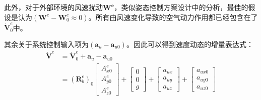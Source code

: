 此外，对于外部环境的风速扰动$\boldsymbol{W^e}$，类似姿态控制方案设计中的分析，最佳的假设是认为$(\boldsymbol{W}^e-\boldsymbol{W}_0^e\approx0)$。所有由风速变化导致的空气动力作用都已经包含在了$\dot{\boldsymbol{V}}^e_0$中。

其余关于系统控制输入项为$(\boldsymbol{a}_{u}-\boldsymbol{a}_{u0})$。因此可以得到速度动态的增量表达式：
\begin{equation}
    \begin{aligned}
        \boldsymbol{\dot{V}}^e&=\boldsymbol{\dot{V}}^e_0+\boldsymbol{a}_{u}-\boldsymbol{a}_{u0}\\
        &=(\boldsymbol{R}_b^e)_0\begin{bmatrix}A_{x0}^e \\A_{y0}^e \\A_{z0}^e\end{bmatrix}+
        \begin{bmatrix}0 \\0 \\g\end{bmatrix}+
        \begin{bmatrix}a_{ux} \\a_{uy} \\a_{uz}\end{bmatrix}+
        \begin{bmatrix}a_{ux0} \\a_{uy0} \\a_{uz0}\end{bmatrix}
    \end{aligned}
    \label{4_13}
\end{equation}

















